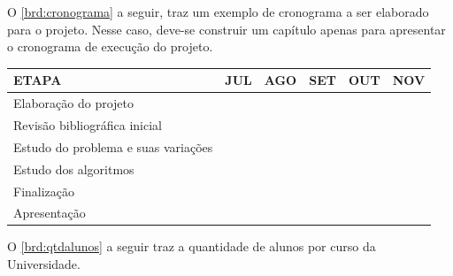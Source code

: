     O \cref{brd:cronograma} a seguir, traz um exemplo de cronograma a ser elaborado para o projeto. Nesse caso, deve-se construir um capítulo apenas para apresentar o cronograma de execução do projeto.

    \begin{board}[!htb]
        \small
        \centering
        \caption{Cronograma}
        \label{brd:cronograma}
        \newcommand{\x}{\cellcolor{gray!40}~}
        \begin{tabular}{|l|c|c|c|c|c|}                                         \hline 
          ETAPA                               & JUL & AGO & SET & OUT & NOV \\ \hline \hline
          Elaboração do projeto               & \x  & \x  & ~   & ~   & ~   \\ \hline
          Revisão bibliográfica inicial       & \x  & \x  & ~   & ~   & ~   \\ \hline
          Estudo do problema e suas variações & ~   & \x  & \x  & ~   & ~   \\ \hline
          Estudo dos algoritmos               & ~   & ~   & \x  & \x  & ~   \\ \hline
          Finalização                         & ~   & ~   & ~   & \x  & ~   \\ \hline
          Apresentação                        & ~   & ~   & ~   & ~   & \x  \\ \hline
        \end{tabular}
        \vspace{0.2cm}
    \end{board}

    \newpage
    O \cref{brd:qtdalunos} a seguir traz a quantidade de alunos por curso da Universidade.

